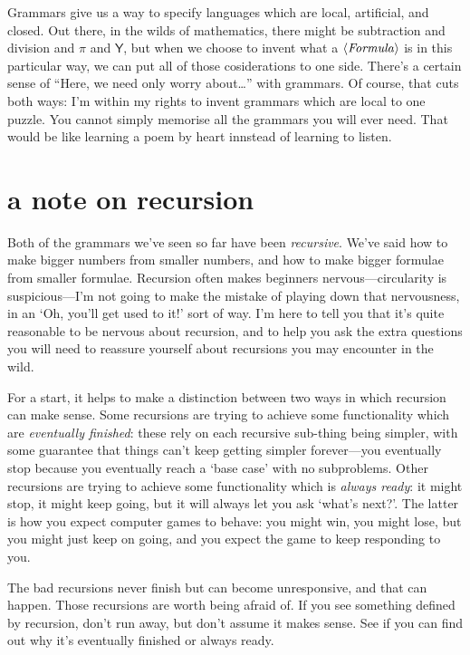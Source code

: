 \documentclass{book}
\begin{document}
Grammars give us a way to specify languages which are local, artificial, and closed. Out there, in the wilds of mathematics, there might be subtraction and division and $\pi$ and $\mathsf{Y}$, but when we choose to invent what a $\langle\mathit{Formula}\rangle$ is in this particular way, we can put all of those cosiderations to one side. There's a certain sense of ``Here, we need only worry about\ldots'' with grammars. Of course, that cuts both ways: I'm within my rights to invent grammars which are local to one puzzle. You cannot simply memorise all the grammars you will ever need. That would be like learning a poem by heart innstead of learning to listen.


\section{a note on recursion}

Both of the grammars we've seen so far have been \emph{recursive}. We've said how to make bigger numbers from smaller numbers, and how to make bigger formulae from smaller formulae. Recursion often makes beginners nervous---circularity is suspicious---I'm not going to make the mistake of playing down that nervousness, in an `Oh, you'll get used to it!' sort of way. I'm here to tell you that it's quite reasonable to be nervous about recursion, and to help you ask the extra questions you will need to reassure yourself about recursions you may encounter in the wild.

For a start, it helps to make a distinction between two ways in which recursion can make sense. Some recursions are trying to achieve some functionality which are \emph{eventually finished}: these rely on each recursive sub-thing being simpler, with some guarantee that things can't keep getting simpler forever---you eventually stop because you eventually reach a `base case' with no subproblems. Other recursions are trying to achieve some functionality which is \emph{always ready}: it might stop, it might keep going, but it will always let you ask `what's next?'. The latter is how you expect computer games to behave: you might win, you might lose, but you might just keep on going, and you expect the game to keep responding to you.

The bad recursions never finish but can become unresponsive, and that can happen. Those recursions are worth being afraid of. If you see something defined by recursion, don't run away, but don't assume it makes sense. See if you can find out why it's eventually finished or always ready.
\end{document}
